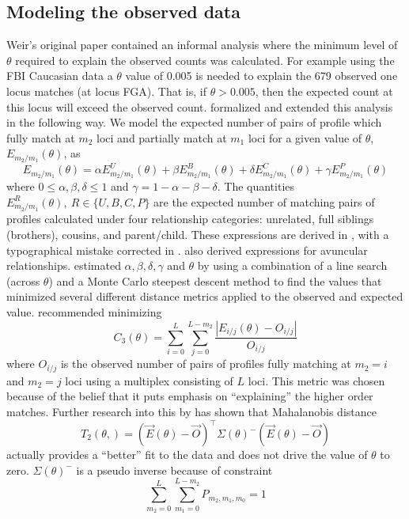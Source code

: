 \documentclass[a4paper,11pt]{article}
\begin{document}
\subsection[Modeling the data]{Modeling the observed data}
Weir's original paper \citep{weir2004} contained an informal analysis
where the minimum level of $\theta$ required to explain the observed
counts was calculated. For example using the FBI Caucasian data
\citep{budowle_1999} a $\theta$ value of 0.005 is needed to explain the
679 observed one locus matches (at locus FGA). That is, if
$\theta>0.005$, then the expected count at this locus will exceed the
observed count. \cite{curran2007} formalized and extended this
analysis in the following way. We model the expected number of pairs
of profile which fully match at $m_2$ loci and partially match at
$m_1$ loci for a given value of $\theta$, $E_{m_2/m_1}(\theta)$, as
\begin{equation*}
  \label{eq:1}
  E_{m_2/m_1}(\theta)=\alpha E_{m_2/m_1}^{U}(\theta)+ \beta
  E_{m_2/m_1}^{B}(\theta)+ \delta E_{m_2/m_1}^{C}(\theta)+ \gamma E_{m_2/m_1}^{P}(\theta)
\end{equation*}
where $0\le\alpha,\beta,\delta\le 1$ and
$\gamma=1-\alpha-\beta-\delta$. The quantities
$E_{m_2/m_1}^R(\theta),~ R\in\{U,B,C,P\}$ are the expected number of
matching pairs of profiles calculated under four relationship
categories: unrelated, full siblings (brothers), cousins, and
parent/child. These expressions are derived in \cite{curran2007},
with a typographical mistake corrected in
\citet{curran2010}. \citet{tvedebrink2010} also derived expressions
for avuncular relationships. \citet{curran2007} estimated
$\alpha,\beta,\delta,\gamma$ and $\theta$ by using a combination of a
line search (across $\theta$) and a Monte Carlo steepest descent
method to find the values that minimized several different distance
metrics applied to the observed and expected value. \citet{curran2007}
recommended minimizing
\begin{equation*}
  \label{eq:2}
  C_3(\theta) = \sum_{i=0}^{L}\sum_{j=0}^{L-m_2}\frac{|E_{i/j}(\theta)-O_{i/j}|}{O_{i/j}}
\end{equation*}
where $O_{i/j}$ is the observed number of pairs of profiles fully
matching at $m_2=i$ and $m_2=j$ loci using a multiplex consisting of
$L$ loci. This metric was chosen because of the belief that it puts
emphasis on ``explaining'' the higher order matches. Further research
into this by \citet{tvedebrink2010,tvedebrink2011} has shown that Mahalanobis
distance
\begin{equation*}
  \label{eq:3}
  T_2(\theta,) = \left(\vec{E}(\theta)-\vec{O}\right)^\top\Sigma(\theta)^{-}\left(\vec{E}(\theta)-\vec{O}\right)
\end{equation*}
actually provides a ``better'' fit to the data and does not drive the
value of $\theta$ to zero. $\Sigma(\theta)^{-}$ is a pseudo
inverse because of constraint
\[
\sum_{m_2=0}^{L}\sum_{m_1=0}^{L-m_2}P_{m_{2},m_{1},m_{0}}=1
\]
\end{document}
